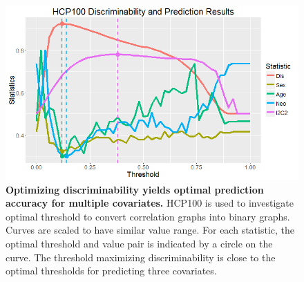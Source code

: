 \documentclass{article}
\begin{document}
\begin{figure}[H]
\includegraphics[width=\linewidth]{../Figs/HCP_100.png}
\caption{{\bf Optimizing discriminability yields optimal prediction accuracy for multiple covariates.} HCP100 is used to investigate optimal threshold to convert correlation graphs into binary graphs. Curves are scaled to have similar value range. For each statistic, the optimal threshold and value pair is indicated by a circle on the curve. The threshold maximizing discriminability is close to the optimal thresholds for predicting three covariates. }
\label{fig:hcp}
\end{figure}
\end{document}
